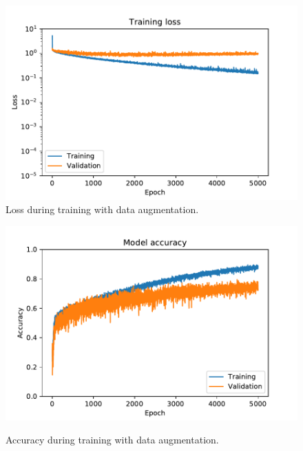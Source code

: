 \documentclass{kththesis}
\begin{document}
\begin{figure}
  \centering
  \includegraphics[width=0.9\linewidth]{img/loss_data_augmentation.pdf}
  \caption{Loss during training with data augmentation.}
  \label{fig:loss_default}
\end{figure}
\begin{figure}
  \centering
  \includegraphics[width=0.9\linewidth]{img/accuracy_data_augmentation.pdf}
  \label{fig:accuracy_default}
  \caption{Accuracy during training with data augmentation.}
\end{figure}
\end{document}

